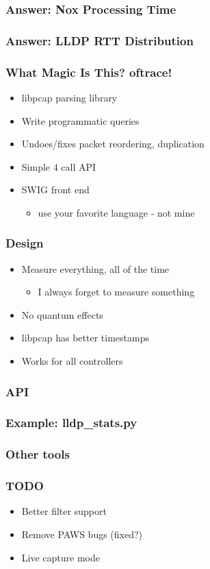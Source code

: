 \documentclass[14pt]{beamer}
\newcommand{\subbullet}[1]{\begin{itemize}\item #1\end{itemize}}
\begin{document}
\begin{frame}
\frametitle{Answer: Nox Processing Time}
\end{frame}
\begin{frame}
\frametitle{Answer: LLDP RTT Distribution}
\end{frame}
\begin{frame}
\frametitle{What Magic Is This? oftrace!}
\begin{itemize}
\item libpcap parsing library
\item Write programmatic queries 
\item Undoes/fixes packet reordering, duplication
\item Simple 4 call API
\item SWIG front end
\subbullet{use your favorite language - not mine}
\end{itemize}
\end{frame}
\begin{frame}
\frametitle{Design}
\begin{itemize}
\item Measure everything, all of the time
\subbullet{I always forget to measure {\red something}}
\item No quantum effects
\item libpcap has better timestamps
\item Works for all controllers
\end{itemize}
\end{frame}
\begin{frame}
\frametitle{API}
\end{frame}
\begin{frame}
\frametitle{Example: lldp\_stats.py}
\end{frame}
\begin{frame}
\frametitle{Other tools}
\end{frame}
\begin{frame}
\frametitle{TODO}
\begin{itemize}
\item Better filter support
\item Remove PAWS bugs (fixed?)
\item Live capture mode
\end{itemize}
\end{frame}
\end{document}
